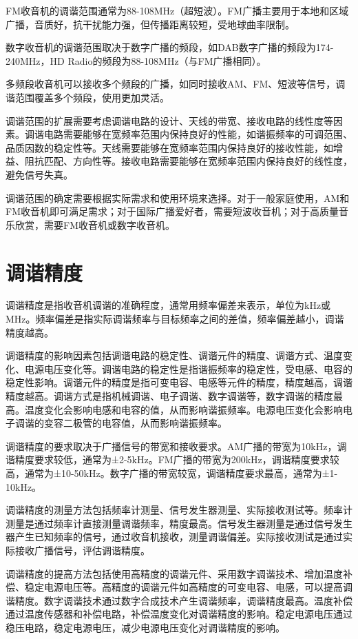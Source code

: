 \documentclass[12pt,UTF8]{ctexbook}
\begin{document}
FM收音机的调谐范围通常为88-108MHz（超短波）。FM广播主要用于本地和区域广播，音质好，抗干扰能力强，但传播距离较短，受地球曲率限制。

数字收音机的调谐范围取决于数字广播的频段，如DAB数字广播的频段为174-240MHz，HD Radio的频段为88-108MHz（与FM广播相同）。

多频段收音机可以接收多个频段的广播，如同时接收AM、FM、短波等信号，调谐范围覆盖多个频段，使用更加灵活。

调谐范围的扩展需要考虑调谐电路的设计、天线的带宽、接收电路的线性度等因素。调谐电路需要能够在宽频率范围内保持良好的性能，如谐振频率的可调范围、品质因数的稳定性等。天线需要能够在宽频率范围内保持良好的接收性能，如增益、阻抗匹配、方向性等。接收电路需要能够在宽频率范围内保持良好的线性度，避免信号失真。

调谐范围的确定需要根据实际需求和使用环境来选择。对于一般家庭使用，AM和FM收音机即可满足需求；对于国际广播爱好者，需要短波收音机；对于高质量音乐欣赏，需要FM收音机或数字收音机。

\section{调谐精度}

调谐精度是指收音机调谐的准确程度，通常用频率偏差来表示，单位为kHz或MHz。频率偏差是指实际调谐频率与目标频率之间的差值，频率偏差越小，调谐精度越高。

调谐精度的影响因素包括调谐电路的稳定性、调谐元件的精度、调谐方式、温度变化、电源电压变化等。调谐电路的稳定性是指谐振频率的稳定性，受电感、电容的稳定性影响。调谐元件的精度是指可变电容、电感等元件的精度，精度越高，调谐精度越高。调谐方式是指机械调谐、电子调谐、数字调谐等，数字调谐的精度最高。温度变化会影响电感和电容的值，从而影响谐振频率。电源电压变化会影响电子调谐的变容二极管的电容值，从而影响谐振频率。

调谐精度的要求取决于广播信号的带宽和接收要求。AM广播的带宽为10kHz，调谐精度要求较低，通常为±2-5kHz。FM广播的带宽为200kHz，调谐精度要求较高，通常为±10-50kHz。数字广播的带宽较宽，调谐精度要求最高，通常为±1-10kHz。

调谐精度的测量方法包括频率计测量、信号发生器测量、实际接收测试等。频率计测量是通过频率计直接测量调谐频率，精度最高。信号发生器测量是通过信号发生器产生已知频率的信号，通过收音机接收，测量调谐偏差。实际接收测试是通过实际接收广播信号，评估调谐精度。

调谐精度的提高方法包括使用高精度的调谐元件、采用数字调谐技术、增加温度补偿、稳定电源电压等。高精度的调谐元件如高精度的可变电容、电感，可以提高调谐精度。数字调谐技术通过数字合成技术产生调谐频率，调谐精度最高。温度补偿通过温度传感器和补偿电路，补偿温度变化对调谐精度的影响。稳定电源电压通过稳压电路，稳定电源电压，减少电源电压变化对调谐精度的影响。
\end{document}
